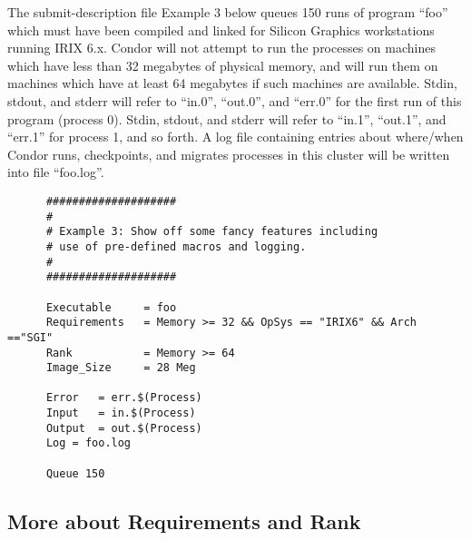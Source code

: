 The submit-description file Example 3 below queues 150
runs of program ``foo'' which must have been compiled and linked for
Silicon Graphics workstations running IRIX 6.x. Condor will not attempt
to run the processes on machines which have less than 32 megabytes of
physical memory, and will run them on machines which have at least 64
megabytes if such machines are available. Stdin, stdout, and stderr will
refer to ``in.0'', ``out.0'', and ``err.0'' for the first run of this program
(process 0). Stdin, stdout, and stderr will refer to ``in.1'', ``out.1'',
and ``err.1'' for process 1, and so forth. A log file containing entries
about where/when Condor runs, checkpoints, and migrates processes in this
cluster will be written into file ``foo.log''.
\begin{verbatim}
      ####################                                                    
      #                                                                       
      # Example 3: Show off some fancy features including                            
      # use of pre-defined macros and logging.                                
      #                                                                       
      ####################                                                    
                                                                          
      Executable     = foo                                                    
      Requirements   = Memory >= 32 && OpSys == "IRIX6" && Arch =="SGI"     
      Rank		     = Memory >= 64
      Image_Size     = 28 Meg                                                 
                                                                          
      Error   = err.$(Process)                                                
      Input   = in.$(Process)                                                 
      Output  = out.$(Process)                                                
      Log = foo.log                                                                       
                                                                          
      Queue 150
\end{verbatim}

\subsection{More about Requirements and Rank}

